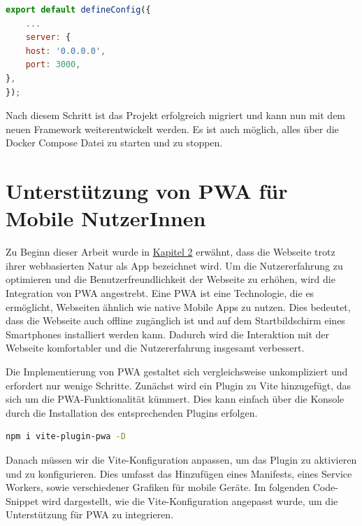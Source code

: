 \begin{lstlisting}[language={JavaScript}, caption={Port Konfiguration für das Vue Projekt}]
export default defineConfig({
    ...
    server: {
    host: '0.0.0.0',
    port: 3000,
},
});
\end{lstlisting}

Nach diesem Schritt ist das Projekt erfolgreich migriert und kann nun mit dem neuen Framework weiterentwickelt werden. Es ist auch möglich, alles über die Docker Compose Datei zu starten und zu stoppen.

\section{Unterstützung von PWA für Mobile NutzerInnen}

Zu Beginn dieser Arbeit wurde in \hyperref[chapter:2]{Kapitel 2} erwähnt, dass die Webseite trotz ihrer webbasierten Natur als App bezeichnet wird.
Um die Nutzererfahrung zu optimieren und die Benutzerfreundlichkeit der Webseite zu erhöhen, wird die Integration von \acf{PWA} angestrebt.
Eine \acs{PWA} ist eine Technologie, die es ermöglicht, Webseiten ähnlich wie native Mobile Apps zu nutzen.
Dies bedeutet, dass die Webseite auch offline zugänglich ist und auf dem Startbildschirm eines Smartphones installiert werden kann.
Dadurch wird die Interaktion mit der Webseite komfortabler und die Nutzererfahrung insgesamt verbessert. \cite{ms-pwa}

Die Implementierung von \acs{PWA} gestaltet sich vergleichsweise unkompliziert und erfordert nur wenige Schritte. Zunächst wird ein Plugin zu Vite hinzugefügt, das sich um die \acs{PWA}-Funktionalität kümmert. Dies kann einfach über die Konsole durch die Installation des entsprechenden Plugins erfolgen.

\begin{lstlisting}[language={bash}, caption={Installation des PWA Plugins}]
npm i vite-plugin-pwa -D 
\end{lstlisting}

Danach müssen wir die Vite-Konfiguration anpassen, um das Plugin zu aktivieren und zu konfigurieren.
Dies umfasst das Hinzufügen eines Manifests, eines Service Workers, sowie verschiedener Grafiken für mobile Geräte.
Im folgenden Code-Snippet wird dargestellt, wie die Vite-Konfiguration angepasst wurde, um die Unterstützung für \acs{PWA} zu integrieren.

